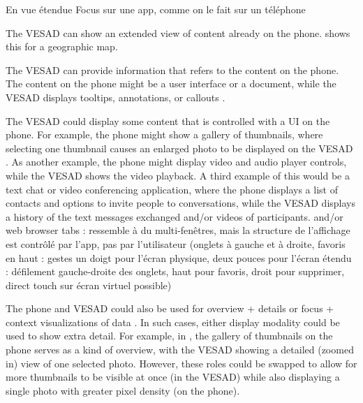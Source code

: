 
En vue étendue
Focus sur une app, comme on le fait sur un téléphone

The VESAD can show an extended view of content already on the phone.  shows this for a geographic map.

The VESAD can provide information that refers to the content on the phone. The content on the phone might be a user interface or a document, while the VESAD displays tooltips, annotations, or callouts .

The VESAD could display some content that is controlled with a UI on the phone. For example, the phone might show a gallery of thumbnails, where selecting one thumbnail causes an enlarged photo to be displayed on the VESAD . As another example, the phone might display video and audio player controls, while the VESAD shows the video playback. A third example of this would be a text chat or video conferencing application, where the phone displays a list of contacts and options to invite people to conversations, while the VESAD displays a history of the text messages exchanged and/or videos of participants.
and/or web browser tabs : ressemble à du multi-fenêtres, mais la structure de l'affichage est contrôlé par l'app, pas par l'utilisateur (onglets à gauche et à droite, favoris en haut : gestes un doigt pour l'écran physique, deux pouces pour l'écran étendu : défilement gauche-droite des onglets, haut pour favoris, droit pour supprimer, direct touch sur écran virtuel possible)

The phone and VESAD could also be used for overview + details or focus + context visualizations of data \cite{cockburn2009,burigat2013}. In such cases, either display modality could be used to show extra detail. For example, in , the gallery of thumbnails on the phone serves as a kind of overview, with the VESAD showing a detailed (zoomed in) view of one selected photo. However, these roles could be swapped to allow for more thumbnails to be visible at once (in the VESAD) while also displaying a single photo with greater pixel density (on the phone).

